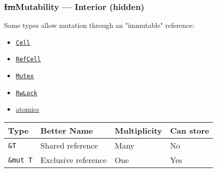 \documentclass[t]{beamer}
\begin{document}
\begin{frame}[fragile]
\frametitle{\st{Im}Mutability --- Interior (hidden)}
\begin{comment}
Some types allow mutation through an "immutable" reference. That's a hint that the
term "immutable reference" is a bit of a misnomer. Instead of talking about "immutable"
and "mutable" references, sometimes it's better to use the terms "shared" and "exclusive",
respectively.

Rust prevents data races by only allowing writes via an exclusive reference.
\end{comment}

Some types allow mutation through an "immutable" reference:

\begin{itemize}
\item \href{https://doc.rust-lang.org/std/cell/struct.Cell.html}{\texttt{Cell}}
\item \href{https://doc.rust-lang.org/std/cell/struct.RefCell.html}{\texttt{RefCell}}
\item \href{https://doc.rust-lang.org/std/sync/struct.Mutex.html}{\texttt{Mutex}}
\item \href{https://doc.rust-lang.org/std/sync/struct.RwLock.html}{\texttt{RwLock}}
\item \href{https://doc.rust-lang.org/std/sync/atomic/}{atomics}
\end{itemize}

\bigskip

\begin{tabular}{l l l l}
Type & Better Name & Multiplicity & Can store \\
\hline
\texttt{\&T} & Shared reference & Many & No \\
\texttt{\&mut T} & Exclusive reference & One & Yes
\end{tabular}

\end{frame}
\end{document}
